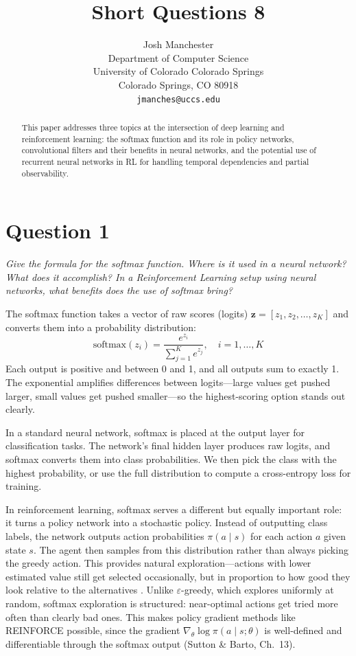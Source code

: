 \documentclass[letterpaper]{article}
\title{Short Questions 8}
\author{
    Josh Manchester\\
    Department of Computer Science\\
    University of Colorado Colorado Springs\\
    Colorado Springs, CO 80918\\
    \texttt{jmanches@uccs.edu}
}
\begin{document}
\maketitle

\begin{abstract}
This paper addresses three topics at the intersection of deep learning and reinforcement learning: the softmax function and its role in policy networks, convolutional filters and their benefits in neural networks, and the potential use of recurrent neural networks in RL for handling temporal dependencies and partial observability.
\end{abstract}

\section*{Question 1}
\textit{Give the formula for the softmax function. Where is it used in a neural network? What does it accomplish? In a Reinforcement Learning setup using neural networks, what benefits does the use of softmax bring?}

\vspace{0.5em}

The softmax function takes a vector of raw scores (logits) $\mathbf{z} = [z_1, z_2, \ldots, z_K]$ and converts them into a probability distribution:
\begin{equation}
\text{softmax}(z_i) = \frac{e^{z_i}}{\sum_{j=1}^{K} e^{z_j}}, \quad i = 1, \ldots, K
\end{equation}
Each output is positive and between 0 and 1, and all outputs sum to exactly 1. The exponential amplifies differences between logits---large values get pushed larger, small values get pushed smaller---so the highest-scoring option stands out clearly.

In a standard neural network, softmax is placed at the output layer for classification tasks. The network's final hidden layer produces raw logits, and softmax converts them into class probabilities. We then pick the class with the highest probability, or use the full distribution to compute a cross-entropy loss for training.

In reinforcement learning, softmax serves a different but equally important role: it turns a policy network into a stochastic policy. Instead of outputting class labels, the network outputs action probabilities $\pi(a \mid s)$ for each action $a$ given state $s$. The agent then samples from this distribution rather than always picking the greedy action. This provides natural exploration---actions with lower estimated value still get selected occasionally, but in proportion to how good they look relative to the alternatives \citep{sutton2018reinforcement}. Unlike $\varepsilon$-greedy, which explores uniformly at random, softmax exploration is structured: near-optimal actions get tried more often than clearly bad ones. This makes policy gradient methods like REINFORCE possible, since the gradient $\nabla_\theta \log \pi(a \mid s; \theta)$ is well-defined and differentiable through the softmax output (Sutton \& Barto, Ch.~13).
\end{document}
